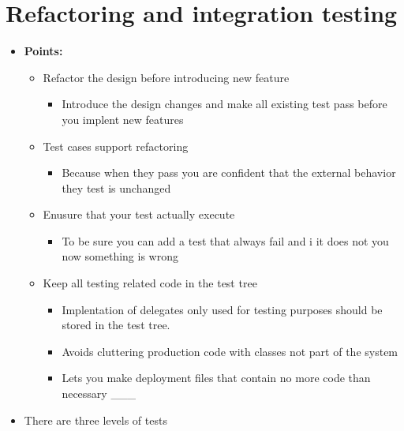 \documentclass[11pt]{article}
\providecommand{\tightlist}{%
      \setlength{\itemsep}{0pt}\setlength{\parskip}{0pt}}
\begin{document}
    \hypertarget{refactoring-and-integration-testing}{%
\section{Refactoring and integration
testing}\label{refactoring-and-integration-testing}}

\begin{itemize}
\tightlist
\item
  \textbf{Points:}

  \begin{itemize}
  \tightlist
  \item
    Refactor the design before introducing new feature

    \begin{itemize}
    \tightlist
    \item
      Introduce the design changes and make all existing test pass
      before you implent new features
    \end{itemize}
  \item
    Test cases support refactoring

    \begin{itemize}
    \tightlist
    \item
      Because when they pass you are confident that the external
      behavior they test is unchanged
    \end{itemize}
  \item
    Enusure that your test actually execute

    \begin{itemize}
    \tightlist
    \item
      To be sure you can add a test that always fail and i it does not
      you now something is wrong
    \end{itemize}
  \item
    Keep all testing related code in the test tree

    \begin{itemize}
    \tightlist
    \item
      Implentation of delegates only used for testing purposes should be
      stored in the test tree.
    \item
      Avoids cluttering production code with classes not part of the
      system
    \item
      Lets you make deployment files that contain no more code than
      necessary \_\_\_
    \end{itemize}
  \end{itemize}
\item
  There are three levels of tests


\end{itemize}
\end{document}
